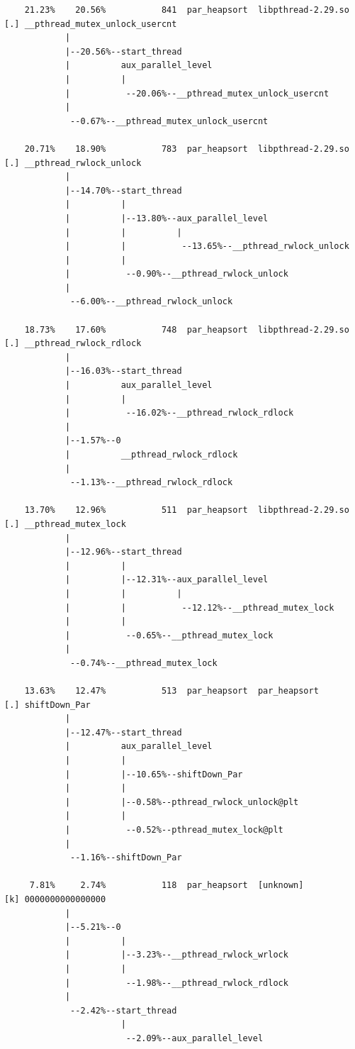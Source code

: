 \documentclass{article}
\begin{document}
\begin{verbatim}
    21.23%    20.56%           841  par_heapsort  libpthread-2.29.so  [.] __pthread_mutex_unlock_usercnt
            |
            |--20.56%--start_thread
            |          aux_parallel_level
            |          |
            |           --20.06%--__pthread_mutex_unlock_usercnt
            |
             --0.67%--__pthread_mutex_unlock_usercnt

    20.71%    18.90%           783  par_heapsort  libpthread-2.29.so  [.] __pthread_rwlock_unlock
            |
            |--14.70%--start_thread
            |          |
            |          |--13.80%--aux_parallel_level
            |          |          |
            |          |           --13.65%--__pthread_rwlock_unlock
            |          |
            |           --0.90%--__pthread_rwlock_unlock
            |
             --6.00%--__pthread_rwlock_unlock

    18.73%    17.60%           748  par_heapsort  libpthread-2.29.so  [.] __pthread_rwlock_rdlock
            |
            |--16.03%--start_thread
            |          aux_parallel_level
            |          |
            |           --16.02%--__pthread_rwlock_rdlock
            |
            |--1.57%--0
            |          __pthread_rwlock_rdlock
            |
             --1.13%--__pthread_rwlock_rdlock

    13.70%    12.96%           511  par_heapsort  libpthread-2.29.so  [.] __pthread_mutex_lock
            |
            |--12.96%--start_thread
            |          |
            |          |--12.31%--aux_parallel_level
            |          |          |
            |          |           --12.12%--__pthread_mutex_lock
            |          |
            |           --0.65%--__pthread_mutex_lock
            |
             --0.74%--__pthread_mutex_lock

    13.63%    12.47%           513  par_heapsort  par_heapsort        [.] shiftDown_Par
            |
            |--12.47%--start_thread
            |          aux_parallel_level
            |          |
            |          |--10.65%--shiftDown_Par
            |          |
            |          |--0.58%--pthread_rwlock_unlock@plt
            |          |
            |           --0.52%--pthread_mutex_lock@plt
            |
             --1.16%--shiftDown_Par

     7.81%     2.74%           118  par_heapsort  [unknown]           [k] 0000000000000000
            |
            |--5.21%--0
            |          |
            |          |--3.23%--__pthread_rwlock_wrlock
            |          |
            |           --1.98%--__pthread_rwlock_rdlock
            |
             --2.42%--start_thread
                       |
                        --2.09%--aux_parallel_level


\end{verbatim}
\end{document}
